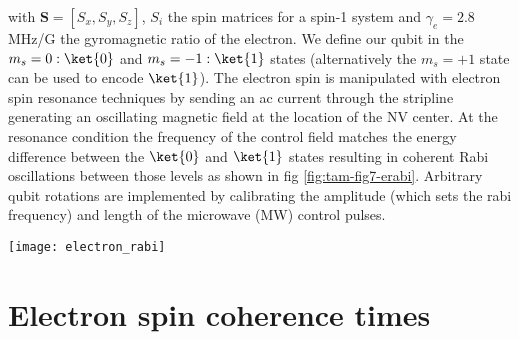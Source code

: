 with $\mathbf{S} =[S_x,S_y,S_z]$,  $S_i$ the spin matrices for a spin-1 system and $\gamma_e = 2.8$ MHz/G the gyromagnetic ratio of the electron. We define our qubit in the $m_s = 0 :\ket{0}$ and $m_s = -1 : \ket{1}$ states (alternatively the $m_s = + 1$ state can be used to encode $\ket{1}$). The electron spin is manipulated with electron spin resonance techniques by sending an ac current through the stripline generating an oscillating magnetic field at the location of the NV center. At the resonance condition the frequency of the control field matches the energy difference between the $\ket{0}$ and $\ket{1}$ states resulting in coherent Rabi oscillations between those levels as shown in fig \ref{fig:tam-fig7-erabi}. Arbitrary qubit rotations are implemented by calibrating the amplitude (which sets the rabi frequency) and length of the microwave (MW) control pulses.

\label{sec:groundstatecontrol}
\begin{figure*}
	\centering
	\texttt{[image: electron\_rabi]}
	\caption{\label{fig:tam-fig7-erabi} \textbf{} (a) Coherent qubit rotations of the electron spin are performed by varying the length of a MW pulse. Solid line is a sinusoidal fit from which we determine the Rabi frequency $(7.67 \pm 0.02)$ MHz. (b) Ramsey measurements for two different NV centers where the wait time between two $\pi$/2 pulses is varied. From a fit to equation \ref{eq:tam-ramsey} we find $T_2^{*} = (0.96 \pm 0.03)$ and $(3.09 \pm 0.05) \mu$s for the upper and lower panel respectively. The coupling to the nitrogen spin is $A_{\parallel} = (2.20 \pm 0.01)$ and $(2.195 \pm 0.002) $MHz. For the bottom panel two additional frequency components are included in the fit to account for the strongly coupled $^{13}C$. We find a coupling strength of ($384 \pm 3$) kHz.  All datapoints are corrected to account for imperfect readout and initialization.}
\end{figure*}



\section{Electron spin coherence times}

